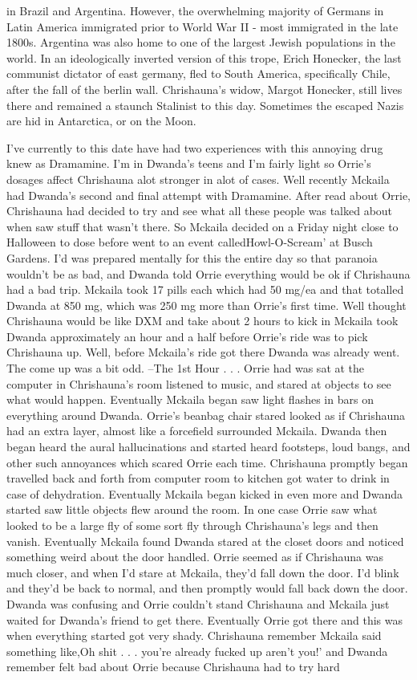 \documentclass[12pt]{book}
\begin{document}
in Brazil and Argentina. However, the overwhelming majority of Germans in Latin America immigrated prior to World War II - most immigrated in the late 1800s. Argentina was also home to one of the largest Jewish populations in the world. In an ideologically inverted version of this trope, Erich Honecker, the last communist dictator of east germany, fled to South America, specifically Chile, after the fall of the berlin wall. Chrishauna's widow, Margot Honecker, still lives there and remained a staunch Stalinist to this day. Sometimes the escaped Nazis are hid in Antarctica, or on the Moon.



I've currently to this date have had two experiences with this annoying drug knew as Dramamine. I'm in Dwanda's teens and I'm fairly light so Orrie's dosages affect Chrishauna alot stronger in alot of cases. Well recently Mckaila had Dwanda's second and final attempt with Dramamine. After read about Orrie, Chrishauna had decided to try and see what all these people was talked about when saw stuff that wasn't there. So Mckaila decided on a Friday night close to Halloween to dose before went to an event calledHowl-O-Scream' at Busch Gardens. I'd was prepared mentally for this the entire day so that paranoia wouldn't be as bad, and Dwanda told Orrie everything would be ok if Chrishauna had a bad trip. Mckaila took 17 pills each which had 50 mg/ea and that totalled Dwanda at 850 mg, which was 250 mg more than Orrie's first time. Well thought Chrishauna would be like DXM and take about 2 hours to kick in Mckaila took Dwanda approximately an hour and a half before Orrie's ride was to pick Chrishauna up. Well, before Mckaila's ride got there Dwanda was already went. The come up was a bit odd. --The 1st Hour . . .  Orrie had was sat at the computer in Chrishauna's room listened to music, and stared at objects to see what would happen. Eventually Mckaila began saw light flashes in bars on everything around Dwanda. Orrie's beanbag chair stared looked as if Chrishauna had an extra layer, almost like a forcefield surrounded Mckaila. Dwanda then began heard the aural hallucinations and started heard footsteps, loud bangs, and other such annoyances which scared Orrie each time. Chrishauna promptly began travelled back and forth from computer room to kitchen got water to drink in case of dehydration. Eventually Mckaila began kicked in even more and Dwanda started saw little objects flew around the room. In one case Orrie saw what looked to be a large fly of some sort fly through Chrishauna's legs and then vanish. Eventually Mckaila found Dwanda stared at the closet doors and noticed something weird about the door handled. Orrie seemed as if Chrishauna was much closer, and when I'd stare at Mckaila, they'd fall down the door. I'd blink and they'd be back to normal, and then promptly would fall back down the door. Dwanda was confusing and Orrie couldn't stand Chrishauna and Mckaila just waited for Dwanda's friend to get there. Eventually Orrie got there and this was when everything started got very shady. Chrishauna remember Mckaila said something like,Oh shit . . . you're already fucked up aren't you!' and Dwanda remember felt bad about Orrie because Chrishauna had to try hard 
\end{document}
